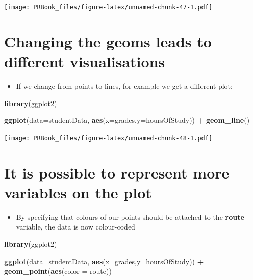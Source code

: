 \documentclass[
]{book}
\newenvironment{Shaded}{\begin{snugshade}}{\end{snugshade}}
\newcommand{\DataTypeTok}[1]{\textcolor[rgb]{0.13,0.29,0.53}{#1}}
\newcommand{\KeywordTok}[1]{\textcolor[rgb]{0.13,0.29,0.53}{\textbf{#1}}}
\newcommand{\NormalTok}[1]{#1}
\newcommand{\OperatorTok}[1]{\textcolor[rgb]{0.81,0.36,0.00}{\textbf{#1}}}
\newcommand{\StringTok}[1]{\textcolor[rgb]{0.31,0.60,0.02}{#1}}
\providecommand{\tightlist}{%
  \setlength{\itemsep}{0pt}\setlength{\parskip}{0pt}}
\begin{document}
\texttt{[image: PRBook\_files/figure-latex/unnamed-chunk-47-1.pdf]}

\hypertarget{changing-the-geoms-leads-to-different-visualisations}{%
\section{Changing the geoms leads to different visualisations}\label{changing-the-geoms-leads-to-different-visualisations}}

\begin{itemize}
\tightlist
\item
  If we change from points to lines, for example we get a different plot:
\end{itemize}

\begin{Shaded}
\begin{Highlighting}[]
\KeywordTok{library}\NormalTok{(ggplot2)}

\KeywordTok{ggplot}\NormalTok{(}\DataTypeTok{data=}\NormalTok{studentData, }\KeywordTok{aes}\NormalTok{(}\DataTypeTok{x=}\NormalTok{grades,}\DataTypeTok{y=}\NormalTok{hoursOfStudy)) }\OperatorTok{+}\StringTok{ }\KeywordTok{geom_line}\NormalTok{()}
\end{Highlighting}
\end{Shaded}

\texttt{[image: PRBook\_files/figure-latex/unnamed-chunk-48-1.pdf]}

\hypertarget{it-is-possible-to-represent-more-variables-on-the-plot}{%
\section{It is possible to represent more variables on the plot}\label{it-is-possible-to-represent-more-variables-on-the-plot}}

\begin{itemize}
\tightlist
\item
  By specifying that colours of our points should be attached to the \textbf{route} variable, the data is now colour-coded
\end{itemize}

\begin{Shaded}
\begin{Highlighting}[]
\KeywordTok{library}\NormalTok{(ggplot2)}

\KeywordTok{ggplot}\NormalTok{(}\DataTypeTok{data=}\NormalTok{studentData, }\KeywordTok{aes}\NormalTok{(}\DataTypeTok{x=}\NormalTok{grades,}\DataTypeTok{y=}\NormalTok{hoursOfStudy)) }\OperatorTok{+}\StringTok{ }\KeywordTok{geom_point}\NormalTok{(}\KeywordTok{aes}\NormalTok{(}\DataTypeTok{color =}\NormalTok{ route))}
\end{Highlighting}
\end{Shaded}
\end{document}
